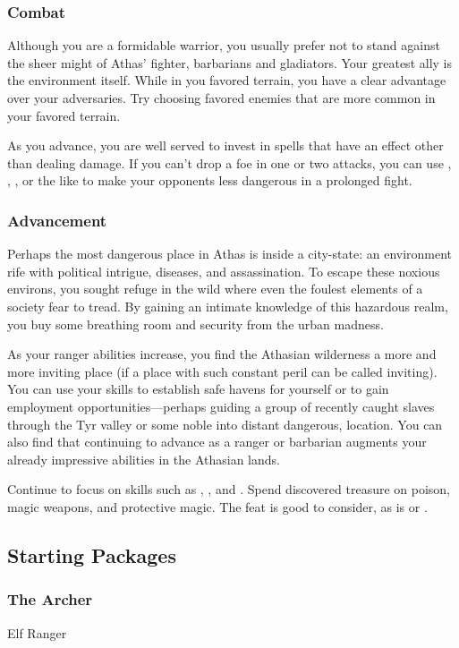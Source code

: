 \subsubsection{Combat}
Although you are a formidable warrior, you usually prefer not to stand against the sheer might of Athas' fighter, barbarians and gladiators. Your greatest ally is the environment itself. While in you favored terrain, you have a clear advantage over your adversaries. Try choosing favored enemies that are more common in your favored terrain.

As you advance, you are well served to invest in spells that have an effect other than dealing damage. If you can't drop a foe in one or two attacks, you can use , , , or the like to make your opponents less dangerous in a prolonged fight.

\subsubsection{Advancement}
Perhaps the most dangerous place in Athas is inside a city-state: an environment rife with political intrigue, diseases, and assassination. To escape these noxious environs, you sought refuge in the wild where even the foulest elements of a society fear to tread. By gaining an intimate knowledge of this hazardous realm, you buy some breathing room and security from the urban madness.

As your ranger abilities increase, you find the Athasian wilderness a more and more inviting place (if a place with such constant peril can be called inviting). You can use your skills to establish safe havens for yourself or to gain employment opportunities---perhaps guiding a group of recently caught slaves through the Tyr valley or some noble into distant dangerous, location. You can also find that continuing to advance as a ranger or barbarian augments your already impressive abilities in the Athasian lands.

Continue to focus on skills such as , , and . Spend discovered treasure on poison, magic weapons, and protective magic. The  feat is good to consider, as is  or .

\subsection{Starting Packages}
\subsubsection{The Archer}
Elf Ranger

